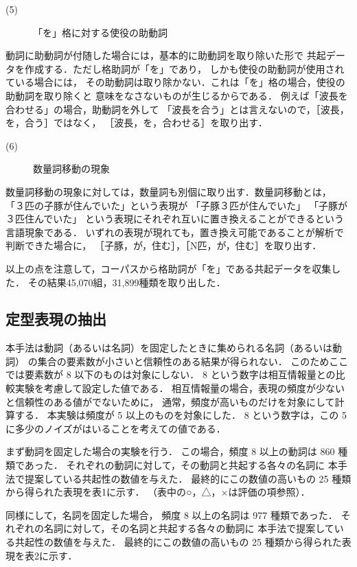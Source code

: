 \begin{description}
\item[(5)] 「を」格に対する使役の助動詞
\end{description}

動詞に助動詞が付随した場合には，基本的に助動詞を取り除いた形で
共起データを作成する．ただし格助詞が「を」であり，
しかも使役の助動詞が使用されている場合には，
その助動詞は取り除かない．これは「を」格の場合，使役の助動詞を取り除くと
意味をなさないものが生じるからである．
例えば「波長を合わせる」の場合，助動詞を外して
「波長を合う」とは言えないので，［波長，を，合う］ではなく，
［波長，を，合わせる］を取り出す．

\begin{description}
\item[(6)] 数量詞移動の現象
\end{description}

数量詞移動の現象に対しては，数量詞も別個に取り出す．数量詞移動とは，
「３匹の子豚が住んでいた」という表現が
「子豚３匹が住んでいた」 「子豚が３匹住んでいた」
という表現にそれぞれ互いに置き換えることができるという
言語現象である\cite{inoue1}．
いずれの表現が現れても，置き換え可能であることが解析で判断できた場合に，
［子豚，が，住む］，［N匹，が，住む］を取り出す．

以上の点を注意して，コーパスから格助詞が「を」である共起データを収集した．
その結果45,070組，31,899種類を取り出した．

\subsection{定型表現の抽出}

本手法は動詞（あるいは名詞）を固定したときに集められる名詞（あるいは動詞）
の集合の要素数が小さいと信頼性のある結果が得られない．
このためここでは要素数が 8 以下のものは対象にしない．
 8 という数字は相互情報量との比較実験を考慮して設定した値である．
相互情報量の場合，表現の頻度が少ないと信頼性のある値がでないために，
通常，頻度が高いものだけを対象にして計算する．
本実験は頻度が 5 以上のものを対象にした．
 8 という数字は，この 5 に多少のノイズがはいることを考えての値である．

まず動詞を固定した場合の実験を行う．
この場合，頻度 8 以上の動詞は 860 種類であった．
それぞれの動詞に対して，その動詞と共起する各々の名詞に
本手法で提案している共起性の数値を与えた．
最終的にこの数値の高いもの 25 種類から得られた表現を表1に示す．
（表中の○，△，×は評価の項参照）．

同様にして，名詞を固定した場合，
頻度 8 以上の名詞は 977 種類であった．
それぞれの名詞に対して，その名詞と共起する各々の動詞に
本手法で提案している共起性の数値を与えた．
最終的にこの数値の高いもの 25 種類から得られた表現を表2に示す．

